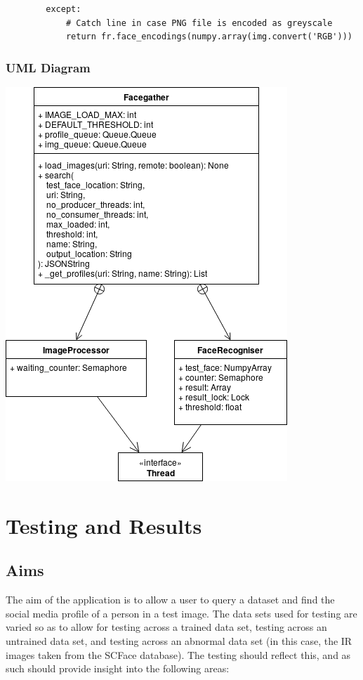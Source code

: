 \documentclass[12pt]{article}
\begin{document}
\begin{lstlisting}
        except:
            # Catch line in case PNG file is encoded as greyscale
            return fr.face_encodings(numpy.array(img.convert('RGB')))
\end{lstlisting}

\subsubsection{UML Diagram}
\includegraphics[scale=1]{res/facegather_uml.png}

\section{Testing and Results}
\subsection{Aims}
The aim of the application is to allow a user to query a dataset and find the social media profile of a person in a test image. The data sets used for testing are varied so as to allow for testing across a trained data set, testing across an untrained data set, and testing across an abnormal data set (in this case, the IR images taken from the SCFace database). The testing should reflect this, and as such should provide insight into the following areas:
\end{document}
